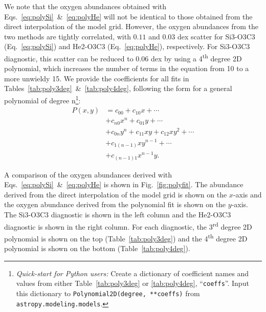 \documentclass[preprint2]{aastex62}
\begin{document}
We note that the oxygen abundances obtained with Eqs.~\ref{eq:polySi}~\&~\ref{eq:polyHe} will not be identical to those obtained from the direct interpolation of the model grid. However, the oxygen abundances from the two methods are tightly correlated, with $0.11$ and $0.03$ dex scatter for Si3-O3C3 (Eq.~\ref{eq:polySi}) and He2-O3C3 (Eq.~\ref{eq:polyHe}), respectively. For Si3-O3C3 diagnostic, this scatter can be reduced to $0.06$ dex by using a 4\textsuperscript{th} degree 2D polynomial, which increases the number of terms in the equation from 10 to a more unwieldy 15. We provide the coefficients for all fits in Tables~\ref{tab:poly3deg}~\&~\ref{tab:poly4deg}, following the form for a general polynomial of degree n\footnote{\emph{Quick-start for Python users:} Create a dictionary of coefficient names and values from either Table~\ref{tab:poly3deg} or \ref{tab:poly4deg}, ``{\tt coeffs}''. Input this dictionary to {\tt Polynomial2D(degree, **coeffs)} from {\tt astropy.modeling.models}.}: 
\begin{equation}\begin{aligned}\label{eq:genPoly}
P(x,y) &= c_{00} + c_{10}x + \dotsb \\
& + c_{n0}x^n + c_{01}y + \dotsb \\
& + c_{0n}y^n + c_{11}xy + c_{12}xy^2 + \dotsb \\
& + c_{1(n-1)}xy^{n-1}+ \dotsb \\
& + c_{(n-1)1}x^{n-1}y. 
\end{aligned}\end{equation}

A comparison of the oxygen abundances derived with Eqs.~\ref{eq:polySi}~\&~\ref{eq:polyHe} is shown in Fig.~\ref{fig:polyfit}. The abundance derived from the direct interpolation of the model grid is shown on the $x$-axis and the oxygen abundance derived from the polynomial fit is shown on the $y$-axis. The Si3-O3C3 diagnostic is shown in the left column and the He2-O3C3 diagnostic is shown in the right column. For each diagnostic, the 3\textsuperscript{rd} degree 2D polynomial is shown on the top (Table~\ref{tab:poly3deg}) and the 4\textsuperscript{th} degree 2D polynomial is shown on the bottom (Table~\ref{tab:poly4deg}).
\end{document}
